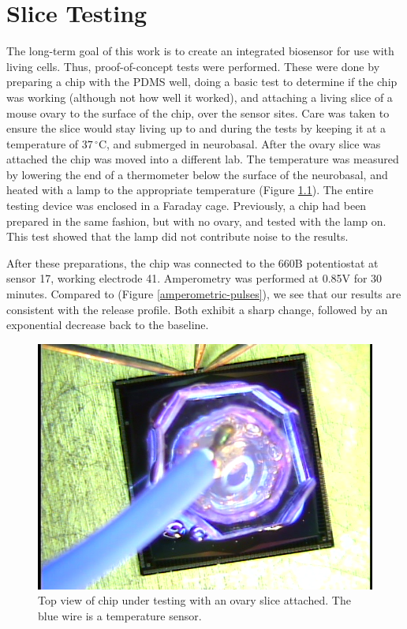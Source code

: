 \chapter{Slice Testing}

The long-term goal of this work is to create an integrated biosensor for use with living cells. Thus, proof-of-concept tests were performed. These were done by preparing a chip with the PDMS well, doing a basic test to determine if the chip was working (although not how well it worked), and attaching a living slice of a mouse ovary to the surface of the chip, over the sensor sites. Care was taken to ensure the slice would stay living up to and during the tests by keeping it at a temperature of $37\,^{\circ}\mathrm{C}$, and submerged in neurobasal. After the ovary slice was attached the chip was moved into a different lab. The temperature was measured by lowering the end of a thermometer below the surface of the neurobasal, and heated with a lamp to the appropriate temperature (Figure \ref{slice-top}). The entire testing device was enclosed in a Faraday cage. Previously, a chip had been prepared in the same fashion, but with no ovary, and tested with the lamp on. This test showed that the lamp did not contribute noise to the results.

After these preparations, the chip was connected to the 660B potentiostat at sensor 17, working electrode 41. Amperometry was performed at 0.85V for 30 minutes. Compared to \cite{mosharok2005aee} (Figure \ref{amperometric-pulses}), we see that our results are consistent with the release profile. Both exhibit a sharp change, followed by an exponential decrease back to the baseline.

\begin{figure}
	\centering
	\includegraphics[width=\linewidth]{figures/slice-top.png}
	\caption[Top view of chip under testing with an ovary slice attached.]{Top view of chip under testing with an ovary slice attached. The blue wire is a temperature sensor.}
	\label{slice-top}
\end{figure}

